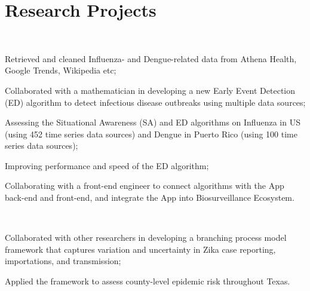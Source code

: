 \documentclass[]{deedy-resume-openfont}
\begin{document}
\begin{minipage}[t]{0.66\textwidth}


\section{Research Projects}

 \\
\vspace{\topsep} %
\begin{tightemize}
\item Retrieved and cleaned Influenza- and Dengue-related data from Athena
  Health, Google Trends, Wikipedia etc;
\item Collaborated with a mathematician in developing a new Early Event
  Detection (ED) algorithm to detect infectious disease outbreaks using
  multiple data sources;
\item Assessing the Situational Awareness (SA) and ED algorithms on Influenza
  in US (using 452 time series data sources) and Dengue in Puerto Rico (using
    100 time series data sources);
\item Improving performance and speed of the ED algorithm;
\item Collaborating with a front-end engineer to connect algorithms with
  the App back-end and front-end, and integrate the App into Biosurveillance
  Ecosystem.
\end{tightemize}
\sectionsep

 \\
\begin{tightemize}
\item Collaborated with other researchers in developing a branching process
  model framework that captures variation and uncertainty in Zika case
  reporting, importations, and transmission;
\item Applied the framework to assess county-level epidemic risk throughout
  Texas.
\end{tightemize}
\sectionsep


\end{minipage}
\end{document}
